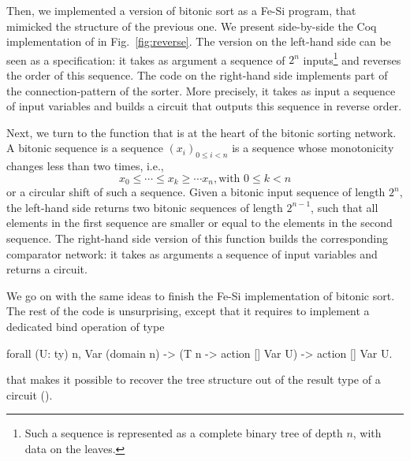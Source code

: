 \documentclass{llncs}
\begin{document}
Then, we implemented a version of bitonic sort as a Fe-Si program,
that mimicked the structure of the previous one. We present
side-by-side the Coq implementation of  in
Fig.~\ref{fig:reverse}.
%
The version on the left-hand side can be seen as a specification: it
takes as argument a sequence of $2^n$ inputs\footnote{Such a sequence
  is represented as a complete binary tree of depth $n$, with data on
  the leaves.} and reverses the order of this sequence.
%
The code on the right-hand side implements part of the
connection-pattern of the sorter. More precisely, it takes as input a
sequence of input variables and builds a circuit that outputs this
sequence in reverse order. 

Next, we turn to the function that is at the heart of the bitonic
sorting network.
%
A bitonic sequence is a sequence $(x_i)_{0 \le i < n}$ is a sequence
whose monotonicity changes less than two times, i.e., 
$$ x_0 \le \cdots \le x_k \ge \cdots x_n, \text{with } 0 \le k < n $$
or a circular shift of such a sequence.
%
Given a bitonic input sequence of length $2^n$, the left-hand side
 returns two bitonic sequences of length $2^{n-1}$,
such that all elements in the first sequence are smaller or equal to
the elements in the second sequence. 
%
The right-hand side version of this function builds the corresponding
comparator network: it takes as arguments a sequence of input
variables and returns a circuit. 

We go on with the same ideas to finish the Fe-Si implementation of
bitonic sort. The rest of the code is unsurprising, except that it
requires to implement a dedicated bind operation of type
\begin{mcoq}
forall (U: ty) n,  Var (domain n) -> (T n -> action [] Var U) -> action [] Var U. 
\end{mcoq}
that makes it possible to recover the tree structure out of the
result type of a circuit ().
\end{document}

